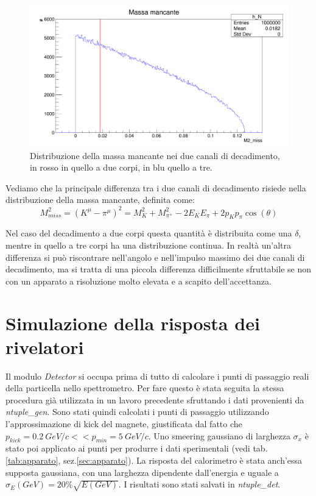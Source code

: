 \documentclass[8pt]{extarticle}
\begin{document}
\begin{figure}
\begin{center}
\includegraphics[scale=0.25]{gen_miss}
\caption{Distribuzione della massa mancante nei due canali di decadimento, in rosso in quello a due corpi, in blu quello a tre.}
\label{fig:gen_miss}
\end{center}
\end{figure}

Vediamo che la principale differenza tra i due canali di decadimento risiede nella distribuzione della massa mancante, definita come: \\
$$
M^2_{miss} = (K^{\mu} - \pi^{\mu})^2 = M^2_K +  M^2_{\pi^+} - 2E_K E_\pi + 2 p_K p_\pi \cos(\theta)
$$

Nel caso del decadimento a due corpi questa quantità è distribuita come una $\delta$, mentre in quello a tre corpi ha una distribuzione continua. 
In realtà un'altra differenza si può riscontrare nell'angolo e nell'impulso massimo dei due canali di decadimento, ma si tratta di una piccola differenza difficilmente sfruttabile se non con un apparato a risoluzione molto elevata e a scapito dell'accettanza. 


\section{Simulazione della risposta dei rivelatori} \label{sec:detector}
Il modulo \textit{Detector} si occupa prima di tutto di calcolare i punti di passaggio reali della particella nello spettrometro. Per fare questo è stata seguita la stessa procedura già utilizzata in un lavoro precedente\cite{spettrometro} sfruttando i dati provenienti da \textit{ntuple\_gen}. Sono stati quindi calcolati i punti di passaggio utilizzando l'approssimazione di kick del magnete, giustificata dal fatto che $p_{kick} = 0.2\ GeV/c << p_{min} = 5\ GeV/c$. Uno smeering gaussiano di larghezza $\sigma_x$ è stato poi applicato ai punti per produrre i dati sperimentali (vedi tab.\ref{tab:apparato}, sez.\ref{sec:apparato}). La risposta del calorimetro è stata anch'essa supposta gaussiana, con una larghezza dipendente dall'energia e uguale a $\sigma_E (GeV) = 20\% \sqrt{E(GeV)}$. I risultati sono stati salvati in \textit{ntuple\_det}.
\end{document}
